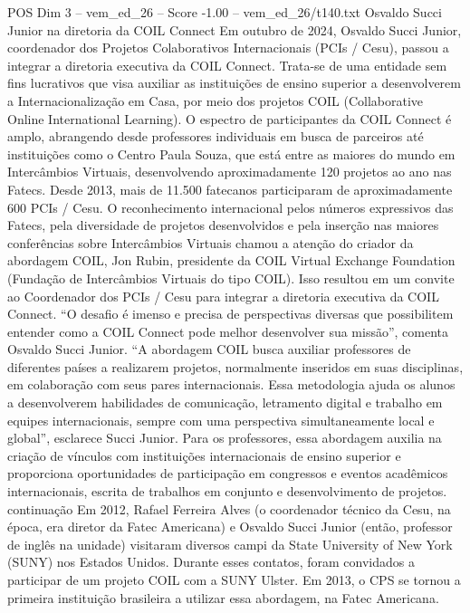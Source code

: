 \begin{textsample}{POS Dim 3 – vem\_ed\_26 – Score -1.00 – vem\_ed\_26/t140.txt}  \label{ex:f3_pos_089}
Osvaldo Succi Junior na diretoria da COIL Connect Em outubro de 2024, Osvaldo Succi Junior, coordenador dos Projetos Colaborativos Internacionais (PCIs / Cesu), passou a integrar a diretoria executiva da COIL Connect.
Trata-se de uma entidade sem fins lucrativos que visa auxiliar as instituições de ensino superior a desenvolverem a Internacionalização em Casa, por meio dos projetos COIL (Collaborative Online International Learning).
O espectro de participantes da COIL Connect é amplo, abrangendo desde professores individuais em busca de parceiros até instituições como o Centro Paula Souza, que está entre as maiores do mundo em Intercâmbios Virtuais, desenvolvendo aproximadamente 120 projetos ao ano nas Fatecs.
Desde 2013, mais de 11.500 fatecanos participaram de aproximadamente 600 PCIs / Cesu.
O reconhecimento internacional pelos números expressivos das Fatecs, pela diversidade de projetos desenvolvidos e pela inserção nas maiores conferências sobre Intercâmbios Virtuais chamou a atenção do criador da abordagem COIL, Jon Rubin, presidente da COIL Virtual Exchange Foundation (Fundação de Intercâmbios Virtuais do tipo COIL).
Isso resultou em um convite ao Coordenador dos PCIs / Cesu para integrar a diretoria executiva da COIL Connect. “O desafio é imenso e precisa de perspectivas diversas que possibilitem entender como a COIL Connect pode melhor desenvolver sua missão”, comenta Osvaldo Succi Junior. “A abordagem COIL busca auxiliar professores de diferentes países a realizarem projetos, normalmente inseridos em suas disciplinas, em colaboração com seus pares internacionais.
Essa metodologia ajuda os alunos a desenvolverem habilidades de comunicação, letramento digital e trabalho em equipes internacionais, sempre com uma perspectiva simultaneamente local e global”, esclarece Succi Junior.
Para os professores, essa abordagem auxilia na criação de vínculos com instituições internacionais de ensino superior e proporciona oportunidades de participação em congressos e eventos acadêmicos internacionais, escrita de trabalhos em conjunto e desenvolvimento de projetos. continuação Em 2012, Rafael Ferreira Alves (o coordenador técnico da Cesu, na época, era diretor da Fatec Americana) e Osvaldo Succi Junior (então, professor de inglês na unidade) visitaram diversos campi da State University of New York (SUNY) nos Estados Unidos.
Durante esses contatos, foram convidados a participar de um projeto COIL com a SUNY Ulster.
Em 2013, o CPS se tornou a primeira instituição brasileira a utilizar essa abordagem, na Fatec Americana.

\end{textsample}
